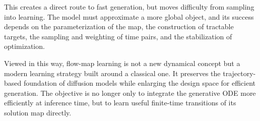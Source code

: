 This creates a direct route to fast generation, but moves difficulty from
sampling into learning. The model must approximate a more global object, and
its success depends on the parameterization of the map, the construction of
tractable targets, the sampling and weighting of time pairs, and the
stabilization of optimization.

Viewed in this way, flow-map learning is not a new dynamical concept but a
modern learning strategy built around a classical one. It preserves the
trajectory-based foundation of diffusion models while enlarging the design
space for efficient generation. The objective is no longer only to integrate
the generative ODE more efficiently at inference time, but to learn useful
finite-time transitions of its solution map directly.







